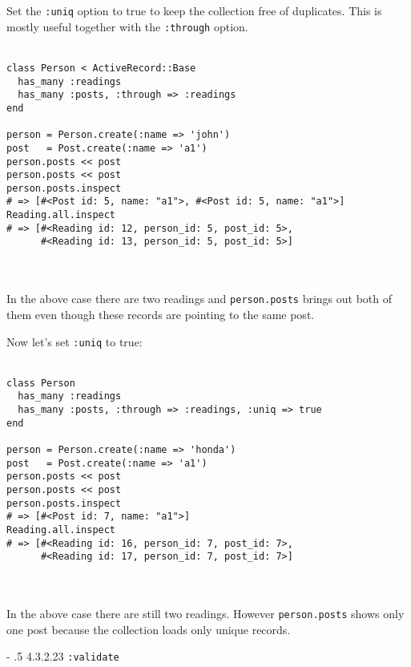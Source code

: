 \documentclass[10pt]{book}
\makeatletter
\renewcommand\paragraph{%
   \@startsection{paragraph}{4}{0mm}%
      {-\baselineskip}%
      {.5\baselineskip}%
      {\normalfont\scriptsize\bfseries}}
\makeatother
\begin{document}
Set the \texttt{:uniq} option to true to keep the collection free of duplicates. This is mostly useful together with the \texttt{:through} option.
\\ \\
\begin{minipage}{\textwidth}{\scriptsize
\begin{verbatim}
class Person < ActiveRecord::Base
  has_many :readings
  has_many :posts, :through => :readings
end
 
person = Person.create(:name => 'john')
post   = Post.create(:name => 'a1')
person.posts << post
person.posts << post
person.posts.inspect 
# => [#<Post id: 5, name: "a1">, #<Post id: 5, name: "a1">]
Reading.all.inspect  
# => [#<Reading id: 12, person_id: 5, post_id: 5>,
      #<Reading id: 13, person_id: 5, post_id: 5>]
\end{verbatim}}
\end{minipage}
\\ \\

In the above case there are two readings and \texttt{person.posts} brings out both of them even though these records are pointing to the same post.

Now let’s set \texttt{:uniq} to true:
\\ \\
\begin{minipage}{\textwidth}{\scriptsize
\begin{verbatim}
class Person
  has_many :readings
  has_many :posts, :through => :readings, :uniq => true
end
 
person = Person.create(:name => 'honda')
post   = Post.create(:name => 'a1')
person.posts << post
person.posts << post
person.posts.inspect 
# => [#<Post id: 7, name: "a1">]
Reading.all.inspect  
# => [#<Reading id: 16, person_id: 7, post_id: 7>, 
      #<Reading id: 17, person_id: 7, post_id: 7>]
\end{verbatim}}
\end{minipage}
\\ \\

In the above case there are still two readings. However \texttt{person.posts} shows only one post because the collection loads only unique records.

\paragraph{4.3.2.23 \texttt{:validate}}\\ \\\\
\end{document}
